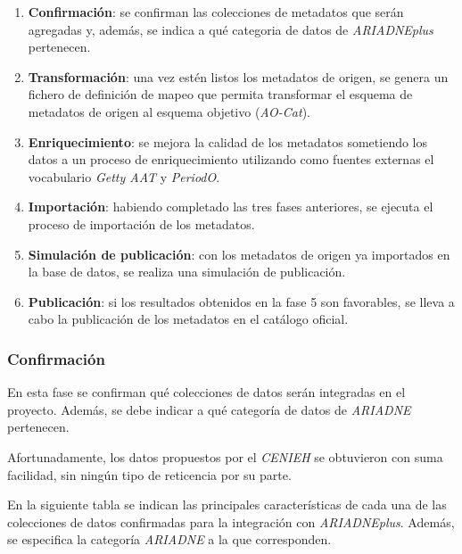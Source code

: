\begin{enumerate}
\def\labelenumi{\arabic{enumi}.}
\tightlist
\item
  \textbf{Confirmación}: se confirman las colecciones de metadatos que
  serán agregadas y, además, se indica a qué categoria de datos de
  \emph{ARIADNEplus} pertenecen.
\item
  \textbf{Transformación}: una vez estén listos los metadatos de origen,
  se genera un fichero de definición de mapeo que permita transformar el
  esquema de metadatos de origen al esquema objetivo (\emph{AO-Cat}).
\item
  \textbf{Enriquecimiento}: se mejora la calidad de los metadatos
  sometiendo los datos a un proceso de enriquecimiento utilizando como
  fuentes externas el vocabulario \emph{Getty AAT} y \emph{PeriodO}.
\item
  \textbf{Importación}: habiendo completado las tres fases anteriores,
  se ejecuta el proceso de importación de los metadatos.
\item
  \textbf{Simulación de publicación}: con los metadatos de origen ya
  importados en la base de datos, se realiza una simulación de
  publicación.
\item
  \textbf{Publicación}: si los resultados obtenidos en la fase 5 son
  favorables, se lleva a cabo la publicación de los metadatos en el
  catálogo oficial.
\end{enumerate}

\subsubsection{Confirmación}

En esta fase se confirman qué colecciones de datos serán integradas en
el proyecto. Además, se debe indicar a qué categoría de datos de \emph{ARIADNE}
pertenecen.


Afortunadamente, los datos propuestos por el \emph{CENIEH} se obtuvieron con suma facilidad,
sin ningún tipo de reticencia por su parte. 

En la siguiente tabla se indican las principales características de cada una de las
colecciones de datos confirmadas para la integración con \emph{ARIADNEplus}.
Además, se especifica la categoría \emph{ARIADNE} a la que corresponden.

